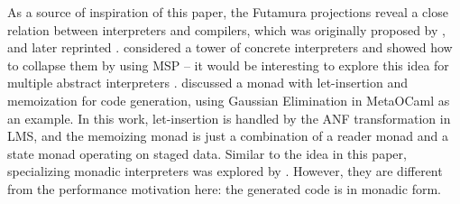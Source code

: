 As a source of inspiration of this paper, the Futamura projections reveal a
close relation between interpreters and compilers, which was
originally proposed by \citet{futamura1971partial}, and later reprinted \cite{Futamura1999}.
\citeauthor{Amin:2017:CTI:3177123.3158140} considered a tower of concrete
interpreters and showed how to collapse them by using MSP -- it would be interesting
to explore this idea for multiple abstract interpreters
\cite{Cousot:2019:AAI:3302515.3290355, Giacobazzi:2015:APA:2676726.2676987}.
\citet{10.1007/11561347_18} discussed a monad with let-insertion and
memoization for code generation, using Gaussian Elimination in MetaOCaml as an
example. In this work, let-insertion is handled by the ANF transformation in
LMS, and the memoizing monad is just a combination of a reader monad and a state monad
operating on staged data.  Similar to the idea in this paper, specializing
monadic interpreters was explored by \citet{danvy1991compiling,
DBLP:conf/dsl/SheardBP99}. However, they are different from the performance motivation
here: the generated code is in monadic form.
